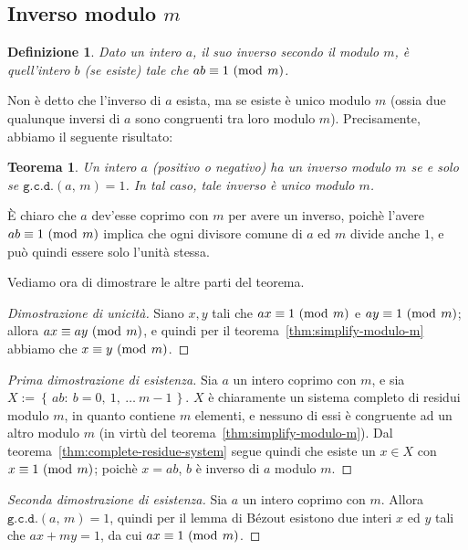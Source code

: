 \documentclass[pdflatex,11pt,a4paper,oneside]{article}
\newcommand{\congruent}[0]{\equiv}
\newcommand{\mmodop}[0]{\ensuremath{\operatorname{mod}}}
\newcommand{\mmod}[1]{\ensuremath{\allowbreak\ (\mmodop\:{#1})}}
\newcommand{\set}[1]{\ensuremath{\left\{\,{#1}\,\right\}}}
\newcommand{\setdef}[2]{\set{{#1}:\:{#2}}}
\newcommand{\gcdop}[0]{\ensuremath{\mathtt{g.c.d.}}}
\newcommand{\xgcd}[1]{\ensuremath{\gcdop\left({#1}\right)}}
\renewcommand{\gcd}[2]{\xgcd{{#1},\,{#2}}}
\newtheorem{theorem}[TheoremLike]{Teorema}
\newtheorem{definition}[TheoremLike]{Definizione}
\begin{document}
\subsection{Inverso modulo $m$}

\begin{definition}
Dato un intero $a$, il suo inverso secondo il modulo $m$, \`e quell'intero
$b$ (se esiste) tale che $ab \congruent 1 \mmod m$.
\end{definition}

Non \`e detto che l'inverso di $a$ esista, ma se esiste \`e unico modulo $m$
(ossia due qualunque inversi di $a$ sono congruenti tra loro modulo $m$).
Precisamente, abbiamo il seguente risultato:

\begin{theorem}
Un intero $a$ (positivo o negativo) ha un inverso modulo $m$ se e solo se
$\gcd{a}{m} = 1$.  In tal caso, tale inverso \`e unico modulo $m$.
\end{theorem}

\`E chiaro che $a$ dev'esse coprimo con $m$ per avere un inverso, poich\`e
l'avere $ab \congruent 1 \mmod m$ implica che ogni divisore comune di $a$
ed $m$ divide anche $1$, e pu\`o quindi essere solo l'unit\`a stessa.

\medskip\noindent
Vediamo ora di dimostrare le altre parti del teorema.

\begin{proof}[Dimostrazione di unicit\`a]
Siano $x, y$ tali che $ax \congruent 1 \mmod m$ e $ay \congruent 1
\mmod m$; allora $ax \congruent ay \mmod m$, e quindi per il
teorema~\eqref{thm:simplify-modulo-m} abbiamo che $x \congruent y
\mmod m$.
\end{proof}

\begin{proof}[Prima dimostrazione di esistenza]
Sia $a$ un intero coprimo con $m$, e sia $X := \setdef{ab}{b = 0,\: 1,\:
\ldots\: m - 1}$. $X$ \`e chiaramente un sistema completo di residui modulo
$m$, in quanto contiene $m$ elementi, e nessuno di essi \`e congruente ad
un altro modulo $m$ (in virt\`u del teorema~\eqref{thm:simplify-modulo-m}).
Dal teorema~\eqref{thm:complete-residue-system} segue quindi che esiste un
$x \in X$ con $x \congruent 1 \mmod m$; poich\`e $x = ab$, $b$ \`e inverso
di $a$ modulo $m$.
\end{proof}

\begin{proof}[Seconda dimostrazione di esistenza]
Sia $a$ un intero coprimo con $m$.  Allora $\gcd{a}{m} = 1$, quindi per il
lemma di B\'ezout esistono due interi $x$ ed $y$ tali che $ax + my = 1$,
da cui $ax \congruent 1 \mmod m$.
\end{proof}
\end{document}
